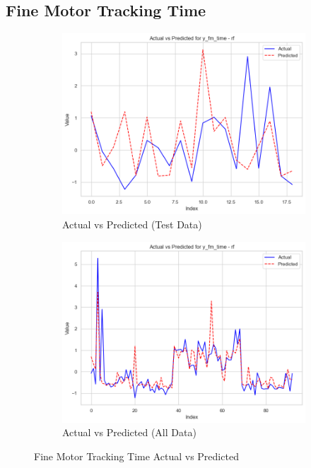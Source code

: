 \subsection*{Fine Motor Tracking Time}

\begin{figure}[htbp]
    \centering
    \begin{subfigure}[b]{0.49\textwidth}
        \centering
        \includegraphics[width=\textwidth]{images/charts/test_data_fine_motor_tracking_time.png}
        \caption{Actual vs Predicted (Test Data)}
        \label{fig:actual_vs_predicted_fm_avg_trk_time_test}
    \end{subfigure}\hfill
    \begin{subfigure}[b]{0.49\textwidth}
        \centering
        \includegraphics[width=\textwidth]{images/charts/all_data_fine_motor_tracking_time.png}
        \caption{Actual vs Predicted (All Data)}
        \label{fig:actual_vs_predicted_fm_avg_trk_time_all_data}
    \end{subfigure}
    \caption{Fine Motor Tracking Time Actual vs Predicted}
    \label{fig:fine_motor_tracking_time_comparison}
\end{figure}


